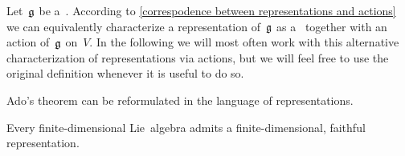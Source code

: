 \begin{fluff}
  Let~$\mathfrak{g}$ be a~\liealgebra{$\kf$}.
  According to \cref{correspodence between representations and actions} we can equivalently characterize a representation of~$\mathfrak{g}$ as a~\vectorspace{$\kf$} together with an action of~$\mathfrak{g}$ on~$V$.
  In the following we will most often work with this alternative characterization of representations via actions, but we will feel free to use the original definition whenever it is useful to do so.
\end{fluff}




\begin{fluff}
  Ado’s theorem can be reformulated in the language of representations.
\end{fluff}


\begin{theorem}
  Every finite-dimensional Lie~algebra admits a finite-\hspace{0pt}dimensional, faithful representation.
\end{theorem}



